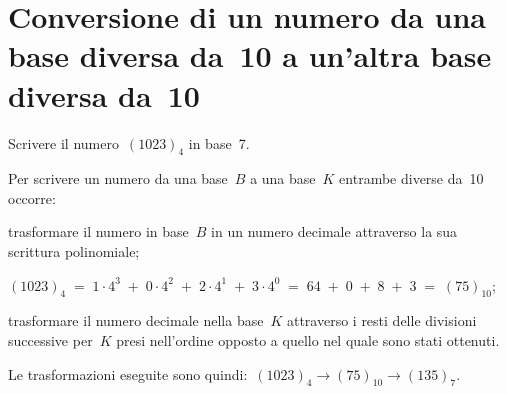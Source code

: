 \ovalbox{\risolvii{\ref{ese:4.6}, \ref{ese:4.7}, \ref{ese:4.8}, \ref{ese:4.9}, \ref{ese:4.10}, \ref{ese:4.11}, \ref{ese:4.12},
\ref{ese:4.13}, \ref{ese:4.14}}}

\section[Conversione da una base diversa da~10 a un'altra base diversa da~10]{Conversione di un numero da una base diversa da~10 a un'altra base diversa da~10}
\begin{exrig}
\begin{esempio}
Scrivere il numero~$(1023)_{4}$ in base~7.

Per scrivere un numero da una base~$B$ a una base~$K$ entrambe diverse da~10 occorre:

\begin{enumeratea}
\item trasformare il numero in base~$B$ in un numero decimale attraverso
la sua scrittura polinomiale;

$(1023)_{4}\;=\;1\cdot 4^{3}\;+\;0\cdot 4^{2}\;+\;2\cdot 4^{1}\;+\;3\cdot
4^{0}\;=\;64\;+\;0\;+\;8\;+\;3\;=\;(75)_{10}$;
\item trasformare il numero decimale nella base~$K$ attraverso i resti
delle divisioni successive per~$K$ presi nell'ordine opposto a quello nel quale sono stati ottenuti.
\begin{center}
 
\end{center}
\end{enumeratea}
\begin{comment}
Applichiamo la procedura indicata:

\begin{enumeratea}
\item
$(1023)_{4}\;=\;1\cdot 4^{3}\;+\;0\cdot 4^{2}\;+\;2\cdot 4^{1}\;+\;3\cdot
4^{0}\;=\;64\;+\;0\;+\;8\;+\;3\;=\;(75)_{10}$;
\item Il numero scritto da sinistra verso destra con i resti delle successive
divisioni per~7 presi nell'ordine opposto a quello nel quale sono stati ottenuti è
$(135)_{7}$.
\end{enumeratea}

\begin{center}
 
\end{center}
\end{comment}

Le trasformazioni eseguite
sono quindi:~$(1023)_{4}\rightarrow (75)_{10}\rightarrow (135)_{7}$.

\end{esempio}
\end{exrig}

